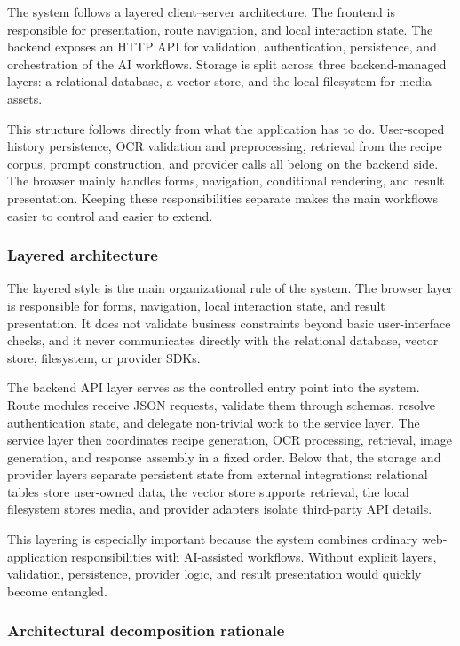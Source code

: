The system follows a layered client--server architecture. The frontend
is responsible for presentation, route navigation, and local
interaction state. The backend exposes an HTTP API for validation,
authentication, persistence, and orchestration of the AI workflows.
Storage is split across three backend-managed layers: a relational
database, a vector store, and the local filesystem for media assets.

This structure follows directly from what the application has to do.
User-scoped history persistence, OCR validation and preprocessing,
retrieval from the recipe corpus, prompt construction, and provider
calls all belong on the backend side. The browser mainly handles forms,
navigation, conditional rendering, and result presentation. Keeping
these responsibilities separate makes the main workflows easier to
control and easier to extend.

\subsubsection{Layered architecture}

The layered style is the main organizational rule of the system. The
browser layer is responsible for forms, navigation, local interaction
state, and result presentation. It does not validate business
constraints beyond basic user-interface checks, and it never
communicates directly with the relational database, vector store,
filesystem, or provider SDKs.

The backend API layer serves as the controlled entry point into the
system. Route modules receive JSON requests, validate them through
schemas, resolve authentication state, and delegate non-trivial work to
the service layer. The service layer then coordinates recipe
generation, OCR processing, retrieval, image generation, and response
assembly in a fixed order. Below that, the storage and provider layers
separate persistent state from external integrations: relational tables
store user-owned data, the vector store supports retrieval, the local
filesystem stores media, and provider adapters isolate third-party API
details.

This layering is especially important because the system combines
ordinary web-application responsibilities with AI-assisted workflows.
Without explicit layers, validation, persistence, provider logic, and
result presentation would quickly become entangled.

\subsubsection{Architectural decomposition rationale}

